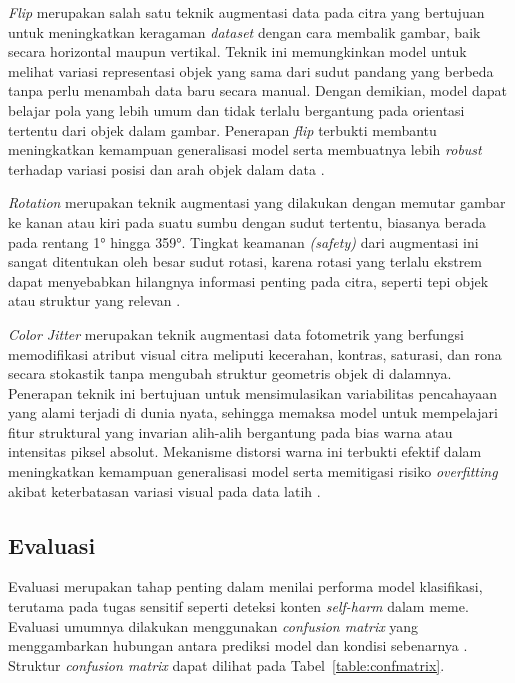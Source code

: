  \label{II.teori11.3.1}

\textit{Flip} merupakan salah satu teknik augmentasi data pada citra yang bertujuan untuk meningkatkan keragaman \textit{dataset} dengan cara membalik gambar, baik secara horizontal maupun vertikal. Teknik ini memungkinkan model untuk melihat variasi representasi objek yang sama dari sudut pandang yang berbeda tanpa perlu menambah data baru secara manual. Dengan demikian, model dapat belajar pola yang lebih umum dan tidak terlalu bergantung pada orientasi tertentu dari objek dalam gambar. Penerapan \textit{flip} terbukti membantu meningkatkan kemampuan generalisasi model serta membuatnya lebih \textit{robust} terhadap variasi posisi dan arah objek dalam data \cite{Xu2023ImageAugmentationSurvey}.

 \label{II.teori11.3.2}

\textit{Rotation} merupakan teknik augmentasi yang dilakukan dengan memutar gambar ke kanan atau kiri pada suatu sumbu dengan sudut tertentu, biasanya berada pada rentang 1° hingga 359°. Tingkat keamanan \textit{(safety)} dari augmentasi ini sangat ditentukan oleh besar sudut rotasi, karena rotasi yang terlalu ekstrem dapat menyebabkan hilangnya informasi penting pada citra, seperti tepi objek atau struktur yang relevan \cite{Shorten2019ImageDataAugmentation}.

 \label{II.teori11.3.3}

\textit{Color Jitter} merupakan teknik augmentasi data fotometrik yang berfungsi memodifikasi atribut visual citra meliputi kecerahan, kontras, saturasi, dan rona secara stokastik tanpa mengubah struktur geometris objek di dalamnya. Penerapan teknik ini bertujuan untuk mensimulasikan variabilitas pencahayaan yang alami terjadi di dunia nyata, sehingga memaksa model untuk mempelajari fitur struktural yang invarian alih-alih bergantung pada bias warna atau intensitas piksel absolut. Mekanisme distorsi warna ini terbukti efektif dalam meningkatkan kemampuan generalisasi model serta memitigasi risiko \textit{overfitting} akibat keterbatasan variasi visual pada data latih \cite{Shorten2019ImageDataAugmentation}.

\subsection{Evaluasi} \label{II.teori12}
Evaluasi merupakan tahap penting dalam menilai performa model klasifikasi, terutama pada tugas sensitif seperti deteksi konten \textit{self-harm} dalam meme. Evaluasi umumnya dilakukan menggunakan \textit{confusion matrix} yang menggambarkan hubungan antara prediksi model dan kondisi sebenarnya \cite{fawcett2006introduction}. Struktur \textit{confusion matrix} dapat dilihat pada Tabel~\ref{table:confmatrix}.

